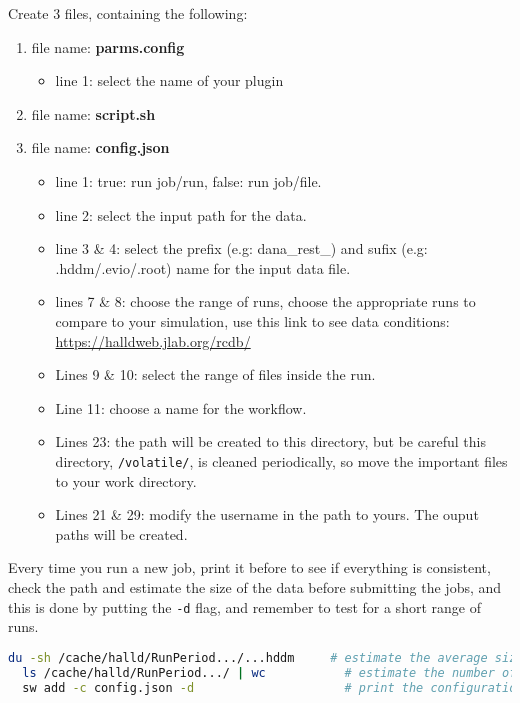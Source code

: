 \documentclass{article}
\begin{document}
Create 3 files, containing the following:
\begin{enumerate}
  
\item file name: \textbf{parms.config}
  
  \begin{itemize}
  \item line 1: select the name of your plugin
  \end{itemize}
  
\item file name: \textbf{script.sh}
  

\item file name: \textbf{config.json}
  
  \begin{itemize}
  \item line 1: true: run job/run, false: run job/file.
  \item line 2: select the input path for the data.
  \item line 3 \& 4: select the prefix (e.g: dana\_rest\_) and sufix (e.g: .hddm/.evio/.root) name for the input data file.
  \item lines 7 \& 8: choose the range of runs, choose the appropriate runs to compare to your simulation, use this link to see data conditions: \url{https://halldweb.jlab.org/rcdb/}
  \item Lines 9 \& 10: select the range of files inside the run.
  \item Line 11: choose a name for the workflow.
  \item Lines 23: the path will be created to this directory, but be careful this directory, \texttt{/volatile/}, is cleaned periodically, so move the important files to your work directory.
  \item Lines 21 \& 29: modify the username in the path to yours. The ouput paths will be created.
  \end{itemize}
\end{enumerate}

Every time you run a new job, print it before to see if everything is consistent, check the path and estimate the size of the data before submitting the jobs, and this is done by putting the \texttt{-d} flag, and remember to test for a short range of runs.

\begin{lstlisting}[language=bash]
  du -sh /cache/halld/RunPeriod.../...hddm     # estimate the average size of data files you want to submit.
  ls /cache/halld/RunPeriod.../ | wc           # estimate the number of files inside the run directory.
  sw add -c config.json -d                     # print the configuration file.
\end{lstlisting}
\end{document}
